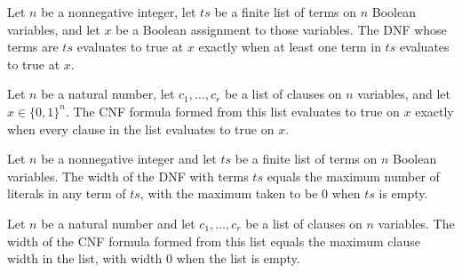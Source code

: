 \begin{theorem}
\label{DNF.eval_mk}
\leanok
{}
Let $n$ be a nonnegative integer, let $ts$ be a finite list of terms on $n$ Boolean
variables, and let $x$ be a Boolean assignment to those variables. The DNF whose terms
are $ts$ evaluates to true at $x$ exactly when at least one term in $ts$ evaluates to
true at $x$.
\end{theorem}

\begin{theorem}
\label{CNF.eval_mk}
\leanok
{}
Let $n$ be a natural number, let $c_1,\ldots,c_r$ be a list of clauses on $n$ variables,
and let $x\in\{0,1\}^n$. The CNF formula formed from this list evaluates to true on $x$
exactly when every clause in the list evaluates to true on $x$.
\end{theorem}

\begin{theorem}
\label{DNF.width_mk}
\leanok
{}
Let $n$ be a nonnegative integer and let $ts$ be a finite list of terms on $n$ Boolean
variables. The width of the DNF with terms $ts$ equals the maximum number of literals in
any term of $ts$, with the maximum taken to be $0$ when $ts$ is empty.
\end{theorem}

\begin{theorem}
\label{CNF.width_mk}
\leanok
{}
Let $n$ be a natural number and let $c_1,\ldots,c_r$ be a list of clauses on $n$
variables. The width of the CNF formula formed from this list equals the maximum clause
width in the list, with width $0$ when the list is empty.
\end{theorem}
